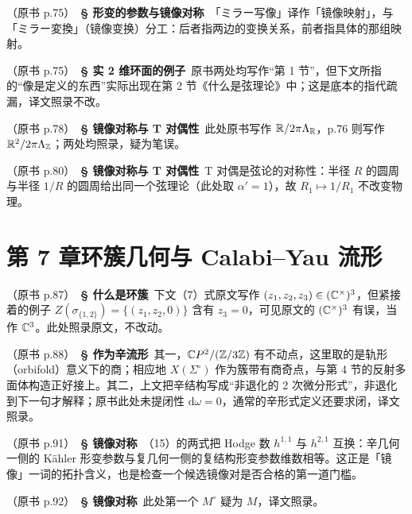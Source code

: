 \noindent （原书 p.75）\ \textbf{§ 形变的参数与镜像对称}\ 「ミラー写像」译作「镜像映射」，与「ミラー変換」（镜像变换）分工：后者指两边的变换关系，前者指具体的那组映射。\par\smallskip

\noindent （原书 p.75）\ \textbf{§ 实 2 维环面的例子}\ 原书两处均写作“第 1 节”，但下文所指的“像是定义的东西”实际出现在第 2 节《什么是弦理论》中；这是底本的指代疏漏，译文照录不改。\par\smallskip

\noindent （原书 p.78）\ \textbf{§ 镜像对称与 T 对偶性}\ 此处原书写作 $\mathbb{R}/2\pi\Lambda_{\mathbb{R}}$，p.76 则写作 $\mathbb{R}^2/2\pi\Lambda_{\mathbb{Z}}$；两处均照录，疑为笔误。\par\smallskip

\noindent （原书 p.80）\ \textbf{§ 镜像对称与 T 对偶性}\ T 对偶是弦论的对称性：半径 $R$ 的圆周与半径 $1/R$ 的圆周给出同一个弦理论（此处取 $\alpha'=1$），故 $R_1\mapsto 1/R_1$ 不改变物理。\par\smallskip

\section*{第 7 章\quad 环簇几何与 Calabi--Yau 流形}

\noindent （原书 p.87）\ \textbf{§ 什么是环簇}\ 下文（7）式原文写作 $(z_1,z_2,z_3)\in(\mathbb{C}^\times)^3$，但紧接着的例子 $Z(\sigma_{\{1,2\}})=\{(z_1,z_2,0)\}$ 含有 $z_3=0$，可见原文的 $(\mathbb{C}^\times)^3$ 有误，当作 $\mathbb{C}^3$。此处照录原文，不改动。\par\smallskip

\noindent （原书 p.88）\ \textbf{§ 作为辛流形}\ 其一，$\mathbb{C}P^2/(\mathbb{Z}/3\mathbb{Z})$ 有不动点，这里取的是轨形（orbifold）意义下的商；相应地 $X(\Sigma^\circ)$ 作为簇带有商奇点，与第 4 节的反射多面体构造正好接上。其二，上文把辛结构写成“非退化的 2 次微分形式”，非退化到下一句才解释；原书此处未提闭性 $\mathrm{d}\omega=0$，通常的辛形式定义还要求闭，译文照录。\par\smallskip

\noindent （原书 p.91）\ \textbf{§ 镜像对称}\ （15）的两式把 Hodge 数 $h^{1,1}$ 与 $h^{2,1}$ 互换：辛几何一侧的 Kähler 形变参数与复几何一侧的复结构形变参数维数相等。这正是「镜像」一词的拓扑含义，也是检查一个候选镜像对是否合格的第一道门槛。\par\smallskip

\noindent （原书 p.92）\ \textbf{§ 镜像对称}\ 此处第一个 $M^\circ$ 疑为 $M$，译文照录。\par\smallskip

